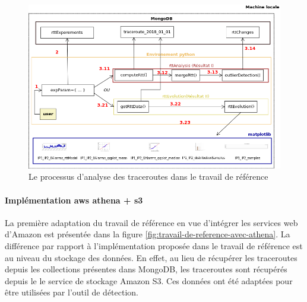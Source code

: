 \begin{figure}[H]
\centering
\includegraphics[width=1\linewidth]{illustrations/travail-de-reference}
\caption{Le processus d'analyse des traceroutes dans le travail de référence}
\label{fig:travail-de-reference}
\end{figure}

\paragraph{Implémentation aws  athena + s3} \label{par:aws-stockage-seulement}


La première adaptation du travail de référence en vue d'intégrer les services web d'Amazon est présentée dans la figure \ref{fig:travail-de-reference-avec-athena}. La différence par rapport à l'implémentation proposée dans le travail de référence est au niveau du stockage des données. En effet, au lieu de récupérer les traceroutes depuis les collections présentes dans MongoDB, les traceroutes sont récupérés depuis le le service de stockage Amazon S3. Ces données ont été adaptées pour être utilisées par l'outil de détection.

